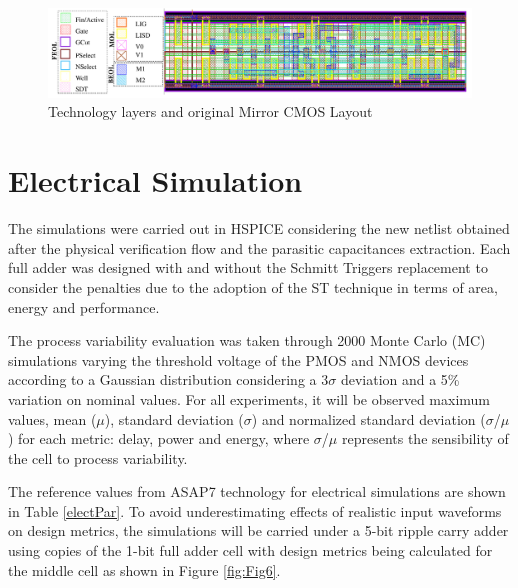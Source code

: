 \documentclass[ecp,tc, english]{iiufrgs}
\begin{document}
\begin{figure}[H]
\centering
\includegraphics[width=\textwidth]{Layers.pdf}
\caption{Technology layers and original Mirror CMOS Layout}
\label{fig:layers}
\end{figure}

\section{Electrical Simulation}

The simulations were carried out in HSPICE considering the new netlist obtained after the physical verification flow and the parasitic capacitances extraction. Each full adder was designed with and without the Schmitt Triggers replacement to consider the penalties due to the adoption of the ST technique in terms of area, energy and performance.

The process variability evaluation was taken
through 2000 Monte Carlo (MC) simulations varying
the threshold voltage of the PMOS and NMOS devices
according to a Gaussian distribution considering a 3\(\sigma\) deviation and a 5\% variation on nominal values. For all experiments, it will be observed maximum values, mean (\(\mu\)), standard deviation (\(\sigma\)) and normalized standard deviation (\(\sigma\)/\(\mu\)) for each metric: delay, power and energy, where \(\sigma\)/\(\mu\) represents the sensibility of the cell to process variability. 

The reference values from ASAP7 technology for electrical simulations are shown in Table \ref{electPar}. To avoid underestimating effects of realistic input waveforms on design metrics, the simulations will be carried under a 5-bit ripple carry adder using copies of the 1-bit full adder cell with design metrics being calculated for the middle cell as shown in Figure \ref{fig:Fig6}. 
\end{document}
